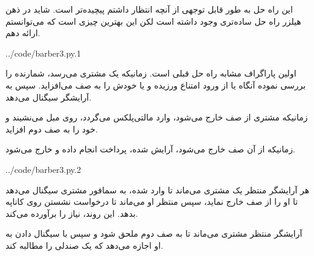 \documentclass{book}
\begin{document}
    این راه حل به طور قابل توجهی از آنچه انتظار داشتم پیچیده‌تر است. شاید در ذهن هیلزر راه حل ساده‌تری وجود داشته است لکن 
    این بهترین چیزی است که می‌توانستم ارائه دهم. 

\begin{latin}
%

{../code/barber3.py.1}
\end{latin}

    اولین پاراگراف مشابه راه حل قبلی است. زمانیکه یک مشتری می‌رسد، شمارنده را بررسی نموده آنگاه یا از ورود امتناع ورزیده و یا خودش را به 
    صف می‌افزاید. سپس به آرایشگر سیگنال می‌دهد. 

    زمانیکه مشتری از صف خارج می‌شود، وارد مالتی‌پلکس می‌گردد، روی مبل می‌نشیند و خود را به صف دوم افزاید. 

    زمانیکه از آن صف خارج می‌شود، آرایش شده، پرداخت انجام داده و خارج می‌شود.

\begin{latin}
%

{../code/barber3.py.2}
\end{latin}


    هر آرایشگر منتظر یک مشتری می‌ماند تا وارد شده، به سمافور مشتری سیگنال می‌دهد تا او را از صف خارج نماید، سپس منتظر او می‌ماند 
    تا درخواست نشستن روی کاناپه بدهد. این روند، نیاز  را برآورده می‌کند.

    آرایشگر منتظر مشتری می‌ماند تا به صف دوم ملحق شود و سپس با سیگنال دادن به او اجازه می‌دهد که یک صندلی را مطالبه کند. 
\end{document}
